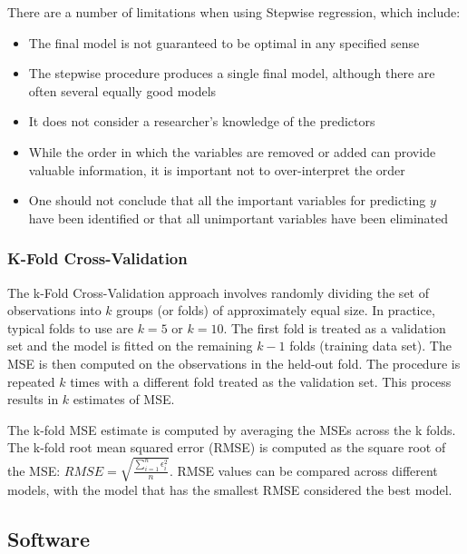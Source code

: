 \documentclass[
]{article}
\providecommand{\tightlist}{%
  \setlength{\itemsep}{0pt}\setlength{\parskip}{0pt}}
\begin{document}
There are a number of limitations when using Stepwise regression, which
include:

\begin{itemize}
\tightlist
\item
  The final model is not guaranteed to be optimal in any specified sense
\item
  The stepwise procedure produces a single final model, although there
  are often several equally good models
\item
  It does not consider a researcher's knowledge of the predictors
\item
  While the order in which the variables are removed or added can
  provide valuable information, it is important not to over-interpret
  the order
\item
  One should not conclude that all the important variables for
  predicting \(y\) have been identified or that all unimportant
  variables have been eliminated
\end{itemize}

\hypertarget{k-fold-cross-validation}{%
\subsubsection{K-Fold Cross-Validation}\label{k-fold-cross-validation}}

The k-Fold Cross-Validation approach involves randomly dividing the set
of observations into \(k\) groups (or folds) of approximately equal
size. In practice, typical folds to use are \(k=5\) or \(k=10\). The
first fold is treated as a validation set and the model is fitted on the
remaining \(k-1\) folds (training data set). The MSE is then computed on
the observations in the held-out fold. The procedure is repeated \(k\)
times with a different fold treated as the validation set. This process
results in \(k\) estimates of MSE.

The k-fold MSE estimate is computed by averaging the MSEs across the k
folds. The k-fold root mean squared error (RMSE) is computed as the
square root of the MSE:
\(RMSE = \sqrt{\frac{\sum_{i=1}^n \epsilon_i^2}{n}}\). RMSE values can
be compared across different models, with the model that has the
smallest RMSE considered the best model.

\hypertarget{software}{%
\subsection{Software}\label{software}}
\end{document}
